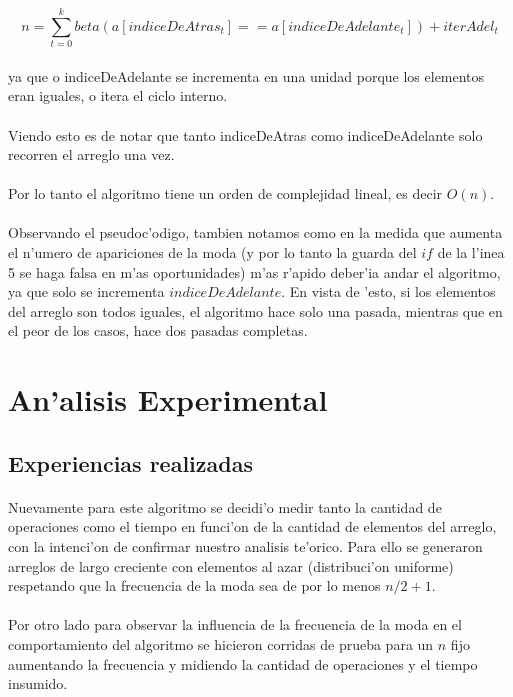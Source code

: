 $$n=\sum_{t=0}^{k}beta(a[indiceDeAtras_t] == a[indiceDeAdelante_t])+ iterAdel_t$$\\

ya que o indiceDeAdelante se incrementa en una unidad porque los elementos eran iguales, o itera el ciclo interno.\\

\paragraph{}
Viendo esto es de notar que tanto indiceDeAtras como indiceDeAdelante solo recorren el arreglo una vez. 
\paragraph{}
Por lo tanto el algoritmo tiene un orden de complejidad lineal, es decir $O(n)$.
\paragraph{}
Observando el pseudoc'odigo, tambien notamos como en la medida que aumenta el n'umero de apariciones de la 
moda (y por lo tanto la guarda del $if$ de la l'inea 5 se haga falsa en m'as oportunidades) m'as r'apido 
deber'ia andar el algoritmo, ya que solo se incrementa $indiceDeAdelante$. En vista de 'esto, si los elementos 
del arreglo son todos iguales, el algoritmo hace solo una pasada, mientras que en el peor de los casos, 
hace dos pasadas completas.

\newpage
\section{An'alisis Experimental}
\subsection{Experiencias realizadas}
\paragraph{}
Nuevamente para este algoritmo se decidi'o medir tanto la cantidad de operaciones como el tiempo en funci'on de la cantidad de 
elementos del arreglo, con la intenci'on de confirmar nuestro analisis te'orico. Para ello se generaron arreglos de largo creciente 
con elementos al azar (distribuci'on uniforme) respetando que la frecuencia de la moda sea de por lo menos $n/2+1$.
\paragraph{}
Por otro lado para observar la influencia de la frecuencia de la moda en el comportamiento del algoritmo se hicieron corridas de prueba
para un $n$ fijo aumentando la frecuencia y midiendo la cantidad de operaciones y el tiempo insumido.
